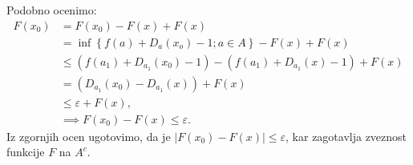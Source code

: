 \documentclass[mat1]{fmfdelo}
\newcommand{\0}{\underline{0}}
\begin{document}
\begin{dokaz}
Podobno ocenimo:
\begin{equation*}
\begin{split}
F(x_0) & = F(x_0) - F(x) + F(x)\\
& =\inf \left \{ f(a) + D_a(x_o) - 1; a \in A \right \} - F(x) + F(x)\\
& \leq (f(a_1) + D_{a_1}(x_0) - 1) -  (f(a_1) + D_{a_1}(x) - 1) + F(x)\\
& = (D_{a_1}(x_0) -  D_{a_1}(x)) + F(x) \\
& \leq \varepsilon + F(x), \\
& \implies F(x_0) - F(x) \leq \varepsilon.
\end{split}
\end{equation*}
Iz zgornjih ocen ugotovimo, da je $|F(x_0) - F(x)| \leq \varepsilon$, kar zagotavlja zveznost funkcije $F$ na $A^c$.


\end{dokaz}
\end{document}
